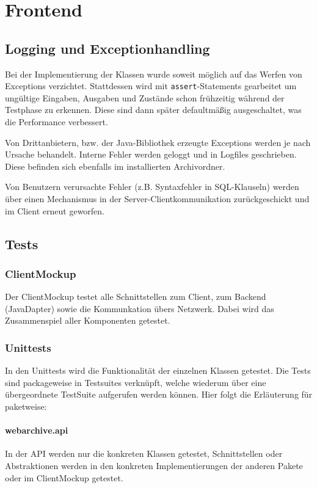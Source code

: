 \chapter{Frontend}

\section{Logging und Exceptionhandling}
Bei der Implementierung der Klassen wurde soweit möglich auf das Werfen von Exceptions verzichtet.
Stattdessen wird mit \lstinline{assert}-Statements gearbeitet um ungültige Eingaben, Ausgaben und Zustände schon frühzeitig während der Testphase zu erkennen. 
Diese sind dann später defaultmäßig ausgeschaltet, was die Performance verbessert.

Von Drittanbietern, bzw. der Java-Bibliothek erzeugte Exceptions werden je nach Ursache behandelt.
Interne Fehler werden geloggt und in Logfiles geschrieben. Diese befinden sich ebenfalls im installierten Archivordner.

Von Benutzern verursachte Fehler (z.B. Syntaxfehler in SQL-Klauseln) werden über einen Mechanismus
in der Server-Clientkommunikation zurückgeschickt und im Client erneut geworfen.

\section{Tests}
\subsection{ClientMockup}
	Der ClientMockup testet alle Schnittstellen zum Client, zum Backend (JavaDapter) sowie die Kommunkation übers Netzwerk.
	Dabei wird das Zusammenspiel aller Komponenten getestet.
\subsection{Unittests}
	In den Unittests wird die Funktionalität der einzelnen Klassen getestet.
	Die Tests sind packageweise in Testsuites verknüpft, welche wiederum über eine übergeordnete TestSuite aufgerufen werden können.
	Hier folgt die Erläuterung für paketweise:	
	\subsubsection{webarchive.api}
		In der API werden nur die konkreten Klassen getestet, Schnittstellen
		oder Abstraktionen werden in den konkreten Implementierungen der anderen Pakete oder im ClientMockup getestet.
